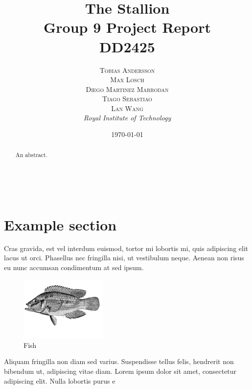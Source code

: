 \documentclass[a4paper, 11pt]{article} %
\title{\textbf{The Stallion}\\ %
Group 9 Project Report\\DD2425} %
\author{\textsc{
Tobias Andersson\\
Max Losch\\
Diego Martinez Marrodan\\
Tiago Sebastiao\\
Lan Wang} %
\\{\textit{Royal Institute of Technology}}
} %
\date{\today} %
\makeatletter
\renewcommand{\maketitle}{ %
\begin{flushright} %
{\LARGE\@title} %

\vspace{50pt} %

{\large\@author} %
\\\@date %

\vspace{40pt} %
\end{flushright}
}
\makeatother
\begin{document}
\maketitle %



\begin{abstract}
An abstract.
\end{abstract}

\newpage
\tableofcontents
\newpage







\section*{Example section}

Cras gravida, est vel interdum euismod, tortor mi lobortis mi, quis adipiscing elit lacus ut orci. 
Phasellus nec fringilla nisi, ut vestibulum neque. 
Aenean non risus eu nunc accumsan condimentum at sed ipsum.

\begin{figure} %
\begin{center}
\includegraphics[width=0.38\textwidth]{fish.png}
\end{center}
\caption{Fish}
\end{figure}
Aliquam fringilla non diam sed varius. \cite{Smith:2012qr} 
Suspendisse tellus felis, hendrerit non bibendum ut, adipiscing vitae diam.
 Lorem ipsum dolor sit amet, consectetur adipiscing elit. 
 Nulla lobortis purus e\cite{Smith:2013jd}
\end{document}
